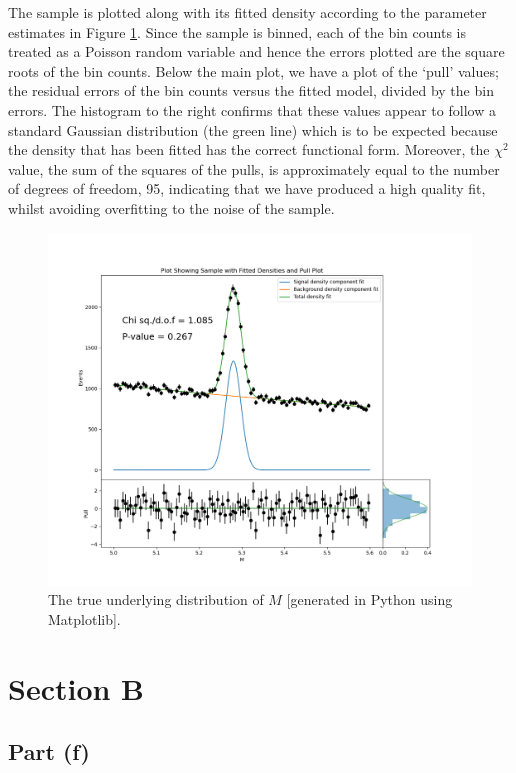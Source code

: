 \documentclass[12pt]{article}
\begin{document}
The sample is plotted along with its fitted density according to the parameter estimates in Figure \ref{part_e_plot}.
Since the sample is binned, each of the bin counts is treated as a Poisson random variable and hence the errors plotted are the square roots of the bin counts.
Below the main plot, we have a plot of the `pull' values; the residual errors of the bin counts versus the fitted model, divided by the bin errors.
The histogram to the right confirms that these values appear to follow a standard Gaussian distribution (the green line) which is to be expected because the density that has been fitted has the correct functional form.
Moreover, the $\chi^2$ value, the sum of the squares of the pulls, is approximately equal to the number of degrees of freedom, 95, indicating that we have produced a high quality fit, whilst avoiding overfitting to the noise of the sample.

\begin{figure}[hbt]
    \includegraphics[scale=0.45]{part_e_plot.png}
    \caption{The true underlying distribution of $M$ [generated in Python using Matplotlib].}
    \label{part_e_plot}
\end{figure}

\section*{Section B}
\subsection*{Part (f)}
\end{document}

